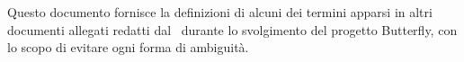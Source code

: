Questo documento fornisce la definizioni di alcuni dei termini apparsi in altri documenti allegati redatti 
dal \gruppo\ durante lo svolgimento del progetto Butterfly, con
lo scopo di evitare ogni forma di ambiguit\`a.